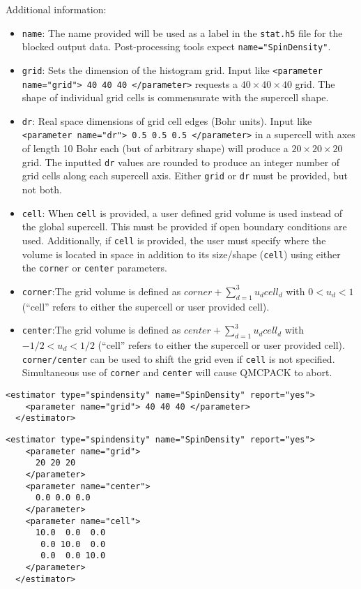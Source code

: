 Additional information:
\begin{itemize}
  \item{\texttt{name}: The name provided will be used as a label in the \texttt{stat.h5} file for the blocked output data.  Post-processing tools expect \texttt{name="SpinDensity"}.}
  \item{\texttt{grid}: Sets the dimension of the histogram grid.  Input like \texttt{<parameter name="grid"> 40 40 40 </parameter>} requests a $40 \times 40\times 40$ grid.  The shape of individual grid cells is commensurate with the supercell shape.}
  \item{\texttt{dr}: Real space dimensions of grid cell edges (Bohr units).  Input like \texttt{<parameter name="dr"> 0.5 0.5 0.5 </parameter>} in a supercell with axes of length 10 Bohr each (but of arbitrary shape) will produce a $20\times 20\times 20$ grid. The inputted \texttt{dr} values are rounded to produce an integer number of grid cells along each supercell axis.  Either \texttt{grid} or \texttt{dr} must be provided, but not both.}
  \item{\texttt{cell}: When \texttt{cell} is provided, a user defined grid volume is used instead of the global supercell.  This must be provided if open boundary conditions are used.  Additionally, if \texttt{cell} is provided, the user must specify where the volume is located in space in addition to its size/shape (\texttt{cell}) using either the \texttt{corner} or \texttt{center} parameters.}
  \item{\texttt{corner}:The grid volume is defined as $corner+\sum_{d=1}^3u_dcell_d$ with $0<u_d<1$ (``cell'' refers to either the supercell or user provided cell).}
  \item{\texttt{center}:The grid volume is defined as $center+\sum_{d=1}^3u_dcell_d$ with $-1/2<u_d<1/2$ (``cell'' refers to either the supercell or user provided cell).  \texttt{corner/center} can be used to shift the grid even if \texttt{cell} is not specified.  Simultaneous use of \texttt{corner} and \texttt{center} will cause QMCPACK to abort.}
\end{itemize}

\begin{lstlisting}[caption=Spin density estimator (uniform grid).]
  <estimator type="spindensity" name="SpinDensity" report="yes">
    <parameter name="grid"> 40 40 40 </parameter>
  </estimator>
\end{lstlisting}

\begin{lstlisting}[caption=Spin density estimator (uniform grid centered about origin).]
  <estimator type="spindensity" name="SpinDensity" report="yes">
    <parameter name="grid">
      20 20 20
    </parameter>
    <parameter name="center">
      0.0 0.0 0.0
    </parameter>
    <parameter name="cell">
      10.0  0.0  0.0
       0.0 10.0  0.0
       0.0  0.0 10.0
    </parameter>
  </estimator>
\end{lstlisting}
   


